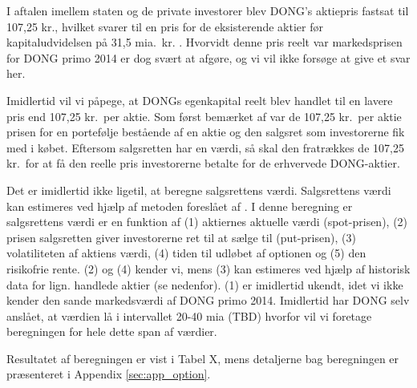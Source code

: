 \documentclass{article}
\begin{document}
I aftalen imellem staten og de private investorer blev  DONG's aktiepris fastsat til 107,25 kr., hvilket svarer til en pris for de eksisterende aktier før kapitaludvidelsen på 31,5 mia.\ kr. \citep{FM2013a}. Hvorvidt denne pris reelt var markedsprisen for DONG primo 2014 er dog svært at afgøre, og vi vil ikke forsøge at give et svar her. 

Imidlertid vil vi påpege, at DONGs egenkapital reelt blev handlet til en lavere pris end 107,25 kr.\ per aktie. Som først bemærket af \cite{Moeller2014} var de 107,25 kr.\ per aktie prisen for en portefølje bestående af en aktie og den salgsret som investorerne fik med i købet. Eftersom salgsretten har en værdi, så skal den fratrækkes de 107,25 kr.\ for at få den reelle pris investorerne betalte for de erhvervede DONG-aktier.




Det er imidlertid ikke ligetil, at beregne salgsrettens værdi. Salgsrettens værdi kan estimeres ved hjælp af metoden foreslået af \cite{Black1973}. I denne beregning er salgsrettens værdi er en funktion af (1) aktiernes aktuelle værdi (spot-prisen), (2) prisen salgsretten giver investorerne ret til at sælge til (put-prisen), (3) volatiliteten af aktiens værdi, (4) tiden til udløbet af optionen og (5) den risikofrie rente. (2) og (4) kender vi, mens (3) kan estimeres ved hjælp af historisk data for lign. handlede aktier (se nedenfor). (1) er imidlertid ukendt, idet vi ikke kender den sande markedsværdi af DONG primo 2014. Imidlertid har DONG selv anslået, at værdien lå i intervallet 20-40 mia (TBD) hvorfor vil vi foretage beregningen for hele dette span af værdier. 

Resultatet af beregningen er vist i Tabel X, mens detaljerne bag beregningen er præsenteret i Appendix \ref{sec:app_option}. 
\end{document}
